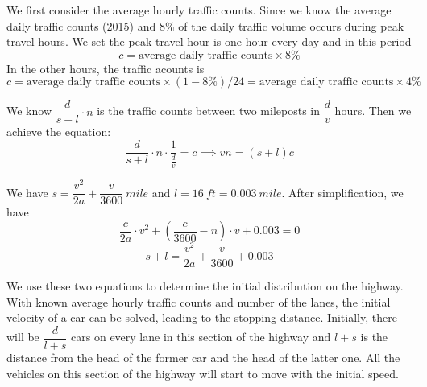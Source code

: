 \documentclass[a4paper]{article}
\begin{document}
	We first consider the average hourly traffic counts. Since we know the average daily traffic counts (2015) and 8\% of the daily traffic volume occurs during peak travel hours. We set the peak travel hour is one hour every day and in this period $$ c=\text{average daily traffic counts}\times 8\% $$ In the other hours, the traffic acounts is  $$ c=\text{average daily traffic counts}\times (1-8\%)/24=\text{average daily traffic counts}\times 4\%  $$
	
	We know $ \dfrac{d}{s+l}\cdot n $ is the traffic counts between two mileposts in $ \dfrac{d}{v} $ hours. Then we achieve the equation:
	$$ \dfrac{d}{s+l}\cdot n\cdot\frac{1}{\frac{d}{v}}=c\implies vn=(s+l)c $$
	
	We have $ s=\dfrac{v^2}{2a}+\dfrac{v}{3600}\ mile $ and $ l=16\ ft=0.003\ mile $. After simplification, we have 
	$$ \dfrac{c}{2a}\cdot v^2+\left(\dfrac{c}{3600}-n\right)\cdot v+0.003=0 $$
	$$ s+l=\dfrac{v^2}{2a}+\dfrac{v}{3600}+0.003 $$
	
	We use these two equations to determine the initial distribution on the highway. With known average hourly traffic counts and number of the lanes, the initial velocity of a car can be solved, leading to the stopping distance. Initially, there will be $ \dfrac{d}{l+s} $ cars on every lane in this section of the highway and $ l+s $ is the distance from the head of the former car and the head of the latter one. All the vehicles on this section of the highway will start to move with the initial speed.
	
\end{document}
